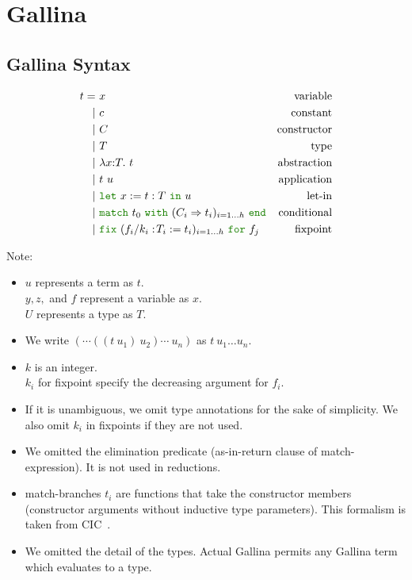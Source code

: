 \documentclass[a4paper,fleqn]{article}
\def\gallina{\textrm{Gallina}}
\newcommand{\kwlet}{\mbox{\color{mygreen}\ttfamily let}}
\newcommand{\kwin}{\mbox{\color{mygreen}\ttfamily in}}
\newcommand{\kwmatch}{\mbox{\color{mygreen}\ttfamily match}}
\newcommand{\kwas}{\mbox{\color{mygreen}\ttfamily as}}
\newcommand{\kwreturn}{\mbox{\color{mygreen}\ttfamily return}}
\newcommand{\kwwith}{\mbox{\color{mygreen}\ttfamily with}}
\newcommand{\kwend}{\mbox{\color{mygreen}\ttfamily end}}
\newcommand{\kwfix}{\mbox{\color{mygreen}\ttfamily fix}}
\newcommand{\kwfor}{\mbox{\color{mygreen}\ttfamily for}}
\newcommand{\lamT}[3]{\lambda #1\mathord{:}#2.~#3}
\newcommand{\letin}[3]{\kwlet~#1:=#2~\kwin~#3}
\newcommand{\match}[4]{\kwmatch~#1~\kwwith~(#2 \Rightarrow #3)_{#4}~\kwend}
\newcommand{\fixT}[5]{\kwfix~(#1:\!#2 := #3)_{#4}~\kwfor~#5}
\begin{document}
\section{\gallina{}}\label{sec:gallina}
\subsection{\gallina{} Syntax}\label{sec:gallina-syntax}

\begin{align*}
  t =&\ x & \text{variable} \\
    |&\ c & \text{constant} \\
    |&\ C & \text{constructor} \\
    |&\ T & \text{type} \\
    |&\ \lamT{x}{T}{t}        & \text{abstraction} \\
    |&\ t~u                   & \text{application} \\
    |&\ \letin{x}{t:T}{u}     & \text{let-in} \\
    |&\ \match{t_0}{C_i}{t_i}{i=1\dots h} & \text{conditional} \\
    |&\ \fixT{f_i/k_i}{T_i}{t_i}{i=1\dots h}{f_j} & \text{fixpoint}
\end{align*}
\raggedright
{\small Note:
\begin{itemize}
  \item $u$ represents a term as $t$. \\ $y, z,$ and $f$ represent a variable as $x$. \\ $U$ represents a type as $T$.
  \item We write $(\cdots((t~u_1)~u_2)\cdots~u_n)$ as $t~u_1\dots u_n$.
  \item $k$ is an integer. \\ $k_i$ for fixpoint specify the decreasing argument for $f_i$.
  \item If it is unambiguous, we omit type annotations for the sake of simplicity.  We also omit $k_i$ in fixpoints if they are not used.
  \item We omitted the elimination predicate (\kwas-\kwin-\kwreturn{} clause of \kwmatch-expression).  It is not used in reductions.
  \item \kwmatch-branches $t_i$ are functions that take the constructor members (constructor arguments without inductive type parameters).
    This formalism is taken from CIC~\cite{coqrefman8.12.0}.
  \item We omitted the detail of the types.  Actual \gallina{} permits any \gallina{} term which evaluates to a type.
\end{itemize}}
\end{document}
